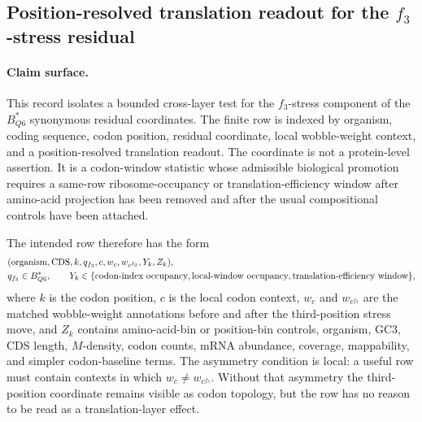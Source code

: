 \subsection{Position-resolved translation readout for the $f_3$-stress residual}\label{sec:q6-f3-stress-position-resolved-translation-readout-cross-layer}

\paragraph{Claim surface.}
This record isolates a bounded cross-layer test for the $f_3$-stress component of the $B^*_{Q6}$ synonymous residual coordinates.  The finite row is indexed by organism, coding sequence, codon position, residual coordinate, local wobble-weight context, and a position-resolved translation readout.  The coordinate is not a protein-level assertion.  It is a codon-window statistic whose admissible biological promotion requires a same-row ribosome-occupancy or translation-efficiency window after amino-acid projection has been removed and after the usual compositional controls have been attached.

The intended row therefore has the form
$$
\begin{aligned}
&({\rm organism}, {\rm CDS}, k, q_{f_3}, c, w_c, w_{c^{f_3}}, Y_k, Z_k),\\
&q_{f_3}\in B^*_{Q6},\qquad Y_k\in\{\text{codon-index occupancy},\text{local-window occupancy},\text{translation-efficiency window}\},
\end{aligned}
$$
where $k$ is the codon position, $c$ is the local codon context, $w_c$ and $w_{c^{f_3}}$ are the matched wobble-weight annotations before and after the third-position stress move, and $Z_k$ contains amino-acid-bin or position-bin controls, organism, GC3, CDS length, $M$-density, codon counts, mRNA abundance, coverage, mappability, and simpler codon-baseline terms.  The asymmetry condition is local: a useful row must contain contexts in which $w_c\neq w_{c^{f_3}}$.  Without that asymmetry the third-position coordinate remains visible as codon topology, but the row has no reason to be read as a translation-layer effect.

